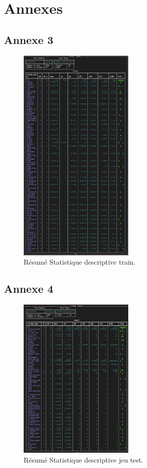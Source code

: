 
\chapter*{Annexes}

\section*{Annexe 3}
\label{sec:annexe3}
\begin{figure}[H]
\centering
\includegraphics[width=0.5\textwidth]{figures/Annexe3.png}
\caption{Résumé Statistique descriptive train.}
\label{fig:annexe3}
\end{figure}

\section*{Annexe 4}
\label{sec:annexe4}
\begin{figure}[H]
\centering
\includegraphics[width=0.5\textwidth]{figures/Annexe4.png}
\caption{Résumé Statistique descriptive jeu test.}
\label{fig:annexe4}
\end{figure}

